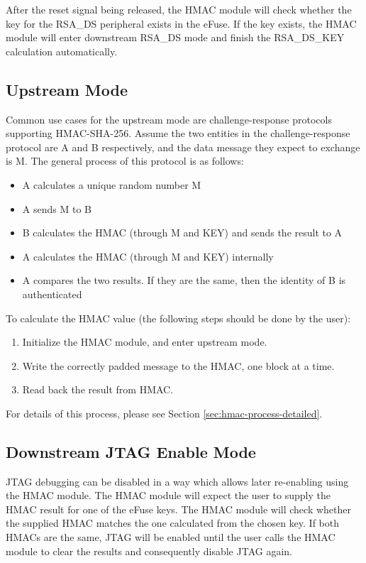 \documentclass[main\_\_EN.tex]{subfiles}
\begin{document}
After the reset signal being released, the HMAC module will check whether the key for the RSA\_DS peripheral exists in the eFuse. If the key exists, the HMAC module will enter downstream RSA\_DS mode and finish the RSA\_DS\_KEY calculation automatically.

\subsection{Upstream Mode}
Common use cases for the upstream mode are challenge-response protocols supporting HMAC-SHA-256.
Assume the two entities in the challenge-response protocol are A and B respectively, and the data message they expect to exchange is M. The general process of this protocol is as follows:

\begin{itemize}
    \item A calculates a unique random number M
    \item A sends M to B
    \item B calculates the HMAC (through M and KEY) and sends the result to A
    \item A calculates the HMAC (through M and KEY) internally
    \item A compares the two results. If they are the same, then the identity of B is authenticated
\end{itemize}

To calculate the HMAC value (the following steps should be done by the user):

\begin{enumerate}
    \item Initialize the HMAC module, and enter upstream mode.
    \item Write the correctly padded message to the HMAC, one block at a time.
    \item Read back the result from HMAC.
\end{enumerate}

For details of this process, please see Section \ref{sec:hmac-process-detailed}.


\subsection{Downstream JTAG Enable Mode}

JTAG debugging can be disabled in a way which allows later re-enabling using the HMAC module. The HMAC module will expect the user to supply the HMAC result for one of the eFuse keys. The HMAC module will check whether the supplied HMAC matches the one calculated from the chosen key. If both HMACs are the same, JTAG will be enabled until the user calls the HMAC module to clear the results and consequently disable JTAG again.
\end{document}
